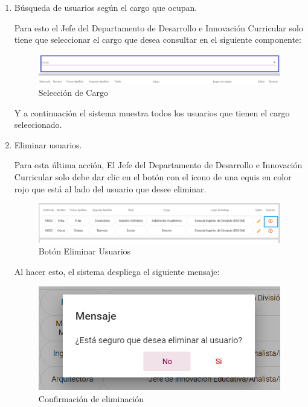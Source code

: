 \begin{enumerate}
	
	\item   Búsqueda de  usuarios según el cargo que ocupan.
	
	Para esto el Jefe del Departamento de Desarrollo e Innovación Curricular solo tiene que seleccionar el cargo que desea consultar en el siguiente componente:
	
	\begin{figure}[H]
		\centering
		\hypertarget{cargo1}{\includegraphics[width=0.7\linewidth]{images/SP5/BtnCargo1}}
		\caption{Selección de Cargo}
		\label{cargo1}
	\end{figure}
	
	Y a continuación el sistema muestra todos los usuarios que tienen el cargo seleccionado.
	
	\newpage
	
	\item Eliminar usuarios.
	
	Para esta última acción, El Jefe del Departamento de Desarrollo e Innovación Curricular solo debe dar clic en el botón con el icono de una equis en color rojo que está al lado del usuario que desee eliminar.
	
	\begin{figure}[H]
		\centering
		\hypertarget{eliminar}{\includegraphics[width=0.7\linewidth]{images/SP5/BtnEliminar}}
		\caption{Botón Eliminar Usuarios}
		\label{eliminar}
	\end{figure}
	
	Al hacer esto, el sistema despliega el siguiente mensaje:
	
	\begin{figure}[H]
		\centering
		\includegraphics[width=0.4\linewidth]{images/SP5/MSG22}
		\caption{Confirmación de eliminación}
		\label{confirmarE}
		

\end{figure}
\end{enumerate}
